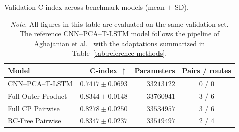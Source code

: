 \begin{table}[H]
\centering\small
\caption{Validation C-index across benchmark models (mean $\pm$ SD).}
\label{tab:standard-bench}
\begin{tabularx}{\linewidth}{@{}Y r r c@{}}
\toprule
\textbf{Model} & \textbf{C-index $\uparrow$} & \textbf{Parameters} & \textbf{Pairs / routes} \\
\midrule
CNN--PCA--T-LSTM & $0.7417\pm0.0693$ & $33213122$ & 0 / 0 \\
Full Outer-Product & $0.8344\pm0.0148$ & $33760941$ & 3 / 6 \\
Full CP Pairwise & $0.8278\pm0.0250$ & $33534957$ & 3 / 6 \\
RC-Free Pairwise & $\mathbf{0.8347\pm0.0237}$ & $33519497$ & 2 / 4 \\
\bottomrule
\end{tabularx}
\caption*{\textit{Note.} All figures in this table are evaluated on the same validation set. The reference CNN--PCA--T-LSTM model follows the pipeline of Aghajanian et al.~\cite{aghajanian2025longitudinal} with the adaptations summarized in Table~\ref{tab:reference-methods}.}
\end{table}
